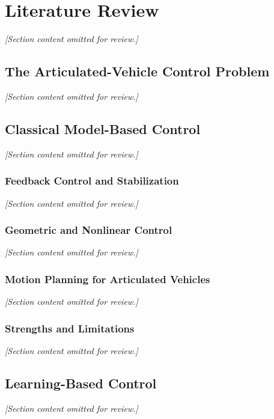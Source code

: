 \chapter{Literature Review}
\label{ch:literature_review}

\textit{[Section content omitted for review.]}

\section{The Articulated-Vehicle Control Problem}
\textit{[Section content omitted for review.]}

\section{Classical Model-Based Control}
\textit{[Section content omitted for review.]}

\subsection{Feedback Control and Stabilization}
\textit{[Section content omitted for review.]}

\subsection{Geometric and Nonlinear Control}
\textit{[Section content omitted for review.]}

\subsection{Motion Planning for Articulated Vehicles}
\textit{[Section content omitted for review.]}

\subsection{Strengths and Limitations}
\textit{[Section content omitted for review.]}

\section{Learning-Based Control}
\textit{[Section content omitted for review.]}

